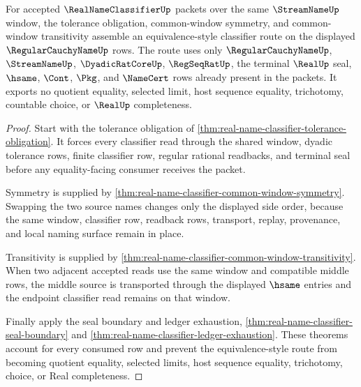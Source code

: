 \begin{theorem}
\label{thm:real-name-classifier-shared-window-equivalence}
For accepted $\RealNameClassifierUp$ packets over the same $\StreamNameUp$ window, the tolerance obligation, common-window symmetry, and common-window transitivity assemble an equivalence-style classifier route on the displayed $\RegularCauchyNameUp$ rows. The route uses only $\RegularCauchyNameUp$, $\StreamNameUp$, $\DyadicRatCoreUp$, $\RegSeqRatUp$, the terminal $\RealUp$ seal, $\hsame$, $\Cont$, $\Pkg$, and $\NameCert$ rows already present in the packets. It exports no quotient equality, selected limit, host sequence equality, trichotomy, countable choice, or $\RealUp$ completeness.
\end{theorem}
\begin{proof}
Start with the tolerance obligation of \autoref{thm:real-name-classifier-tolerance-obligation}. It forces every classifier read through the shared window, dyadic tolerance rows, finite classifier row, regular rational readbacks, and terminal seal before any equality-facing consumer receives the packet.

Symmetry is supplied by \autoref{thm:real-name-classifier-common-window-symmetry}. Swapping the two source names changes only the displayed side order, because the same window, classifier row, readback rows, transport, replay, provenance, and local naming surface remain in place.

Transitivity is supplied by \autoref{thm:real-name-classifier-common-window-transitivity}. When two adjacent accepted reads use the same window and compatible middle rows, the middle source is transported through the displayed $\hsame$ entries and the endpoint classifier read remains on that window.

Finally apply the seal boundary and ledger exhaustion, \autoref{thm:real-name-classifier-seal-boundary} and \autoref{thm:real-name-classifier-ledger-exhaustion}. These theorems account for every consumed row and prevent the equivalence-style route from becoming quotient equality, selected limits, host sequence equality, trichotomy, choice, or Real completeness.
\end{proof}

